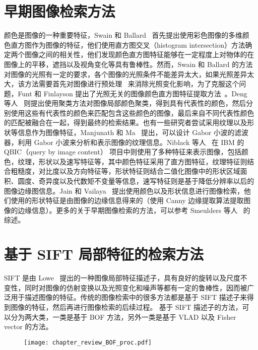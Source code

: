 \section{早期图像检索方法}\label{sec:early_work_review}

颜色是图像的一种重要特征，Swain 和 Ballard~\cite{Swain1991ColorI} 首先提出使用彩色图像的多维颜色直方图作为图像的特征，他们使用直方图交叉（histogram intersection）方法确定两个图像之间的相关性，他们发现颜色直方图特征能够在一定程度上对物体的在图像上的平移，遮挡以及视角变化等具有鲁棒性。然而，Swain 和 Ballard 的方法对图像的光照有一定的要求，各个图像的光照条件不能差异太大，如果光照差异太大，该方法需要首先对图像进行预处理~\cite{Forsyth1990ANA} 来消除光照变化影响，为了克服这个问题，Funt 和 Finlayson 提出了光照无关的图像颜色直方图特征提取方法~\cite{Funt1995ColorCC}。Deng 等人~\cite{Deng2001AnEC} 则提出使用聚类方法对图像局部颜色聚类，得到具有代表性的颜色，然后分别使用这些有代表性的颜色来匹配包含这些颜色的图像，最后来自不同代表性颜色的匹配被融合在一起，得到最终的检索结果。也有一些研究者尝试采用纹理以及形状等信息作为图像特征，Manjunath 和 Ma~\cite{Manjunath1996TextureFF} 提出，可以设计 Gabor 小波的滤波器，利用 Gabor 小波来分析和表示图像的纹理信息。Niblack 等人~\cite{Niblack1993TheQP} 在 IBM 的 QBIC（query by image content） 项目中则使用了多种特征来表示图像，包括颜色，纹理，形状以及速写特征等，其中颜色特征采用了直方图特征，纹理特征则结合粗糙度，对比度以及方向特征等，形状特征则结合二值化图像中的形状区域面积、圆度、奇异度以及代数矩不变量等信息，速写特征则是基于降低分辨率以后的图像边缘图信息。Jain 和 Vailaya~\cite{Jain1996ImageRU} 提出使用颜色以及形状信息进行图像检索，他们使用的形状特征是由图像的边缘信息得来的（使用 Canny 边缘提取算法提取图像的边缘信息）。更多的关于早期图像检索的方法，可以参考 Smeulders 等人~\cite{Smeulders2000ContentBasedIR} 的综述。


\section{基于 SIFT 局部特征的检索方法}\label{sec:sift_based_method_review}

SIFT 是由 Lowe~\cite{Lowe2004DistinctiveIF} 提出的一种图像局部特征描述子，具有良好的旋转以及尺度不变性，同时对图像的仿射变换以及光照变化和噪声等都有一定的鲁棒性，因而被广泛用于描述图像的特征。传统的图像检索中的很多方法都是基于 SIFT 描述子来得到图像的特征，然后再进行图像检索的后续过程。 基于 SIFT 描述子的方法，可以分为两大类，一类是基于 BOF 方法，另外一类是基于 VLAD 以及 Fisher vector 的方法。

\begin{figure}[!t]
\centering
\texttt{[image: chapter\_review\_BOF\_proc.pdf]}
\label{fig:bof_process}
\end{figure}

